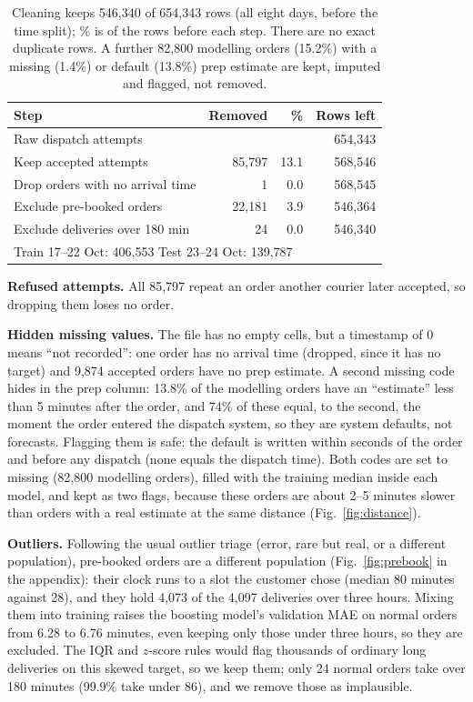 \begin{table}[t]
\centering
\caption{Cleaning keeps 546{,}340 of 654{,}343 rows (all eight days, before the time split); \% is of the
rows before each step. There are no exact duplicate rows. A further 82{,}800 modelling orders (15.2\%)
with a missing (1.4\%) or default (13.8\%) prep estimate are kept, imputed and flagged, not removed.}
\label{tab:cleaning}
\begin{tabular}{lrrr}
\toprule
Step & Removed & \% & Rows left \\
\midrule
Raw dispatch attempts & & & 654{,}343 \\
Keep accepted attempts & 85{,}797 & 13.1 & 568{,}546 \\
Drop orders with no arrival time & 1 & 0.0 & 568{,}545 \\
Exclude pre-booked orders & 22{,}181 & 3.9 & 546{,}364 \\
Exclude deliveries over 180 min & 24 & 0.0 & 546{,}340 \\
\midrule
\multicolumn{4}{l}{Train 17--22 Oct: 406{,}553 \quad Test 23--24 Oct: 139{,}787} \\
\bottomrule
\end{tabular}
\end{table}

\textbf{Refused attempts.} All 85{,}797 repeat an order another courier later accepted, so dropping
them loses no order.

\textbf{Hidden missing values.} The file has no empty cells, but a timestamp of 0 means ``not recorded'':
one order has no arrival time (dropped, since it has no target) and 9{,}874 accepted orders have no prep
estimate. A second missing code hides in the prep column:
13.8\% of the modelling orders have an ``estimate'' less than 5 minutes after the order, and 74\% of these
equal, to the second, the moment the order entered the dispatch system, so they are system defaults, not
forecasts. Flagging them is safe: the default is written within seconds of the order and before any
dispatch (none equals the dispatch time). Both codes are set to missing (82{,}800 modelling orders),
filled with the training median inside each model, and kept as two flags, because these orders are about
2--5 minutes slower than orders with a real estimate at the same distance (Fig.~\ref{fig:distance}).

\textbf{Outliers.} Following the usual outlier triage (error, rare but real, or a different population),
pre-booked orders are a different population (Fig.~\ref{fig:prebook} in the appendix): their clock runs to a slot the
customer chose (median 80 minutes against 28), and they hold 4{,}073 of the 4{,}097 deliveries over three
hours. Mixing them into training raises the boosting model's validation MAE on normal orders from 6.28
to 6.76 minutes, even keeping only those under three hours, so they are excluded. The IQR and $z$-score
rules would flag thousands of ordinary long deliveries on this skewed target, so we keep them; only
24 normal orders take over 180 minutes (99.9\% take under 86), and we remove those as implausible.

